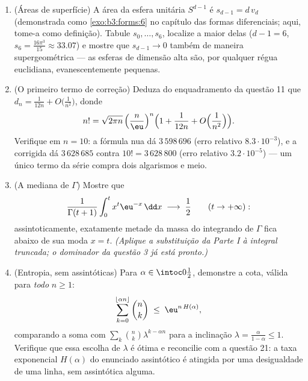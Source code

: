 \begin{problem}
\begin{enumerate}[resume]
        do  são exponencialmente desprezíveis diante de
        $2^n$).
  \item (Áreas de superfície) A área da esfera unitária $S^{d-1}$ é $s_{d-1} = d\,v_d$
        (demonstrada como \cref{exo:b3:forms:6} no capítulo das formas
        diferenciais; aqui, tome-a como definição). Tabule $s_0, \dots, s_6$,
        localize a maior delas ($d - 1 =
        6$, $s_6 = \frac{16\pi^3}{15} \approx 33.07$) e mostre que $s_{d-1} \to 0$ também de
        maneira supergeométrica --- as esferas de dimensão alta são,
        por qualquer régua euclidiana, evanescentemente pequenas.
  \item (O primeiro termo de correção) Deduza do enquadramento da
        questão 11 que $d_n = \frac1{12n} +
        O\bigl(\frac1{n^2}\bigr)$, donde
        \[
        n! = \sqrt{2\pi n}\,\Bigl(\frac
        n\eu\Bigr)^{n}\Bigl(1 + \frac1{12n} +
        O\Bigl(\frac1{n^2}\Bigr)\Bigr).
        \]
        Verifique em $n = 10$: a fórmula nua dá $3\,598\,696$ (erro relativo
        $8.3\cdot10^{-3}$), e a corrigida dá $3\,628\,685$ contra $10! =
        3\,628\,800$ (erro relativo
        $3.2\cdot10^{-5}$) --- um único termo da série compra dois algarismos e
        meio.
  \item (A mediana de $\Gamma$) Mostre que
        \[
        \frac{1}{\Gamma(t+1)}
        \int_0^{t} x^{t}\eu^{-x}\,\dd x
        \;\longrightarrow\; \frac12
        \qquad (t \to +\infty) :
        \]
        assintoticamente, exatamente metade da massa do integrando de
        $\Gamma$ fica abaixo de sua moda $x = t$. \emph{(Aplique
        a substituição da Parte I à integral truncada; o dominador da
        questão 3 já está pronto.)}
  \item (Entropia, sem assintóticas) Para $\alpha \in
        \intoc0{\frac12}$, demonstre a cota,
        válida para \emph{todo} $n \geq 1$:
        \[
        \sum_{k=0}^{\lfloor\alpha n\rfloor}\binom nk
        \;\leq\; \eu^{n\,H(\alpha)} ,
        \]
        comparando a soma com $\sum_k\binom
        nk\lambda^{k-\alpha n}$ para a inclinação $\lambda =
        \frac{\alpha}{1-\alpha} \leq 1$. Verifique
        que essa escolha de $\lambda$ é ótima e reconcilie com a questão
        21: a taxa exponencial $H(\alpha)$ do enunciado assintótico é
        atingida por uma desigualdade de uma linha, sem assintótica
        alguma.
\end{enumerate}
\end{problem}
